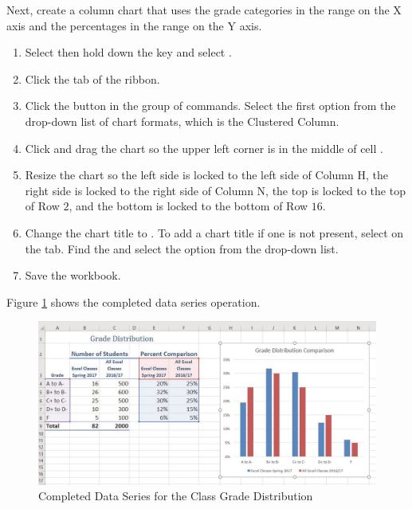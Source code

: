 Next, create a column chart that uses the grade categories in the range  on the X axis and the percentages in the range  on the Y axis. 

\begin{enumerate}
	\item Select  then hold down the  key and select .
	\item Click the  tab of the ribbon.
	\item Click the  button in the  group of commands. Select the first option from the drop-down list of chart formats, which is the Clustered Column.
	\item Click and drag the chart so the upper left corner is in the middle of cell .
	\item Resize the chart so the left side is locked to the left side of Column H, the right side is locked to the right side of Column N, the top is locked to the top of Row $ 2 $, and the bottom is locked to the bottom of Row $ 16 $.
	\item Change the chart title to . To add a chart title if one is not present, select  on the  tab. Find the  and select the  option from the drop-down list.
	\item Save the workbook.
\end{enumerate}

Figure \ref{04:fig17} shows the completed data series operation.

\begin{figure}[H]
	\centering
	\includegraphics[width=\maxwidth{.95\linewidth}]{gfx/ch04_fig17}
	\caption{Completed Data Series for the Class Grade Distribution}
	\label{04:fig17}
\end{figure}

